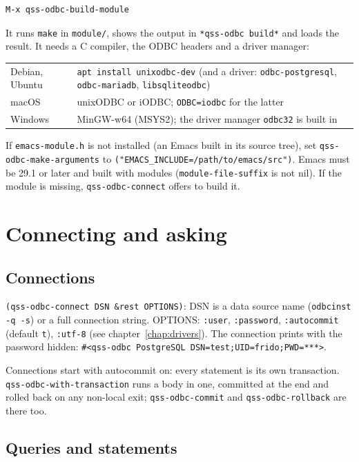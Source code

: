 \documentclass[
  paper=a4, fontsize=11pt, parskip=half, headings=small,
  toc=bibliography, numbers=noenddot, DIV=12
]{scrreprt}
\newcommand{\code}[1]{\texttt{#1}}
\newcommand{\file}[1]{\texttt{#1}}
\newcommand{\kbd}[1]{\texttt{#1}}
\begin{document}
\begin{Verbatim}
M-x qss-odbc-build-module
\end{Verbatim}

It runs \kbd{make} in \file{module/}, shows the output in
\code{*qss-odbc build*} and loads the result. It needs a C compiler, the ODBC
headers and a driver manager:

\noindent\begin{tabularx}{\linewidth}{@{}lX@{}}
\toprule
Debian, Ubuntu & \kbd{apt install unixodbc-dev} (and a driver: \code{odbc-postgresql}, \code{odbc-mariadb}, \code{libsqliteodbc}) \\
macOS & unixODBC or iODBC; \code{ODBC=iodbc} for the latter \\
Windows & MinGW-w64 (MSYS2); the driver manager \file{odbc32} is built in \\
\bottomrule
\end{tabularx}

\medskip
If \file{emacs-module.h} is not installed (an Emacs built in its source
tree), set \code{qss-odbc-make-arguments} to
\code{("EMACS\_INCLUDE=/path/to/emacs/src")}. Emacs must be 29.1 or later and
built with modules (\code{module-file-suffix} is not nil). If the module is
missing, \code{qss-odbc-connect} offers to build it.

\chapter{Connecting and asking}

\section{Connections}

\code{(qss-odbc-connect DSN \&rest OPTIONS)}: DSN is a data source name
(\kbd{odbcinst -q -s}) or a full connection string. OPTIONS: \code{:user},
\code{:password}, \code{:autocommit} (default \code{t}), \code{:utf-8} (see
chapter~\ref{chap:drivers}). The connection prints with the password hidden:
\code{\#<qss-odbc PostgreSQL DSN=test;UID=frido;PWD=***>}.

Connections start with autocommit on: every statement is its own
transaction. \code{qss-odbc-with-transaction} runs a body in one, committed
at the end and rolled back on any non-local exit; \code{qss-odbc-commit} and
\code{qss-odbc-rollback} are there too.

\section{Queries and statements}
\end{document}
